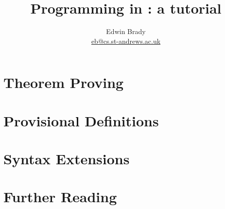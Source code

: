 \documentclass{article}
\title{Programming in \Idris{}: a tutorial}
\author{Edwin Brady \\ \url{eb@cs.st-andrews.ac.uk}}
\begin{document}
\maketitle











\section{Theorem Proving}
\section{Provisional Definitions}
\section{Syntax Extensions}

%
\section{Further Reading}



\end{document}
